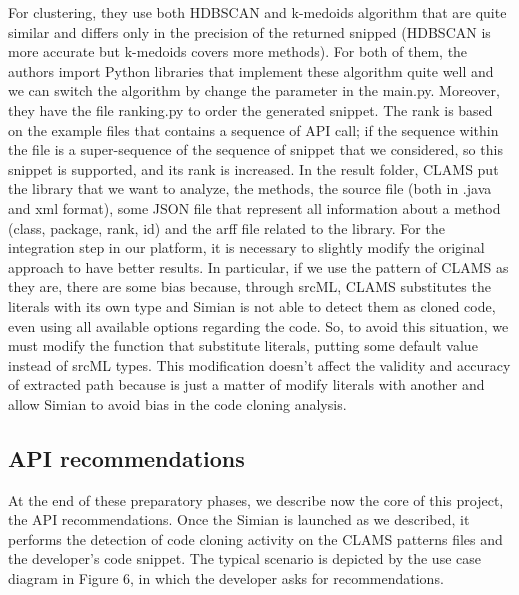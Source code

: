 For clustering, they use both HDBSCAN and k-medoids algorithm that are quite similar and differs only in the precision of the returned snipped (HDBSCAN is more accurate but k-medoids covers more methods). For both of them, the authors import Python libraries that implement these algorithm quite well and we can switch the algorithm by change the parameter in the main.py. Moreover, they have the file ranking.py to order the generated snippet. The rank is based on the example files that contains a sequence of API call; if the sequence within the file is a super-sequence of the sequence of snippet that we considered, so this snippet is supported, and its rank is increased. In the result folder, CLAMS put the library that we want to analyze, the methods, the source file (both in .java and xml format), some JSON file that represent all information about a method (class, package, rank, id) and the arff file related to the library. \newline
For the integration step in our platform, it is necessary to slightly modify the original approach to have better results. In particular, if we use the pattern of CLAMS as they are, there are some bias because, through srcML, CLAMS substitutes the literals with its own type and Simian is not able to detect them as cloned code, even using all available options regarding the code. So, to avoid this situation, we must modify the function that substitute literals, putting some default value instead of srcML types. This modification doesn't affect the validity and accuracy of extracted path because is just a matter of modify literals with another and allow Simian to avoid bias in the code cloning analysis.

\subsection{API recommendations}
At the end of these preparatory phases, we describe now the core of this project, the API recommendations. Once the Simian is launched as we described, it performs the detection of code cloning activity on the CLAMS patterns files and the developer's code snippet. The typical scenario is depicted by the use case diagram in Figure 6, in which the developer asks for recommendations.


